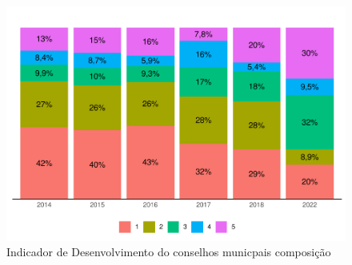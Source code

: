 \documentclass[
  brazilian]{report}
\begin{document}
\begin{figure}
\includegraphics{Censo-SUAS-2022_files/figure-latex/idcom-1} \caption[Indicador de Desenvolvimento do conselhos municpais composição]{Indicador de Desenvolvimento do conselhos municpais composição}\label{fig:idcom}
\end{figure}
\end{document}
